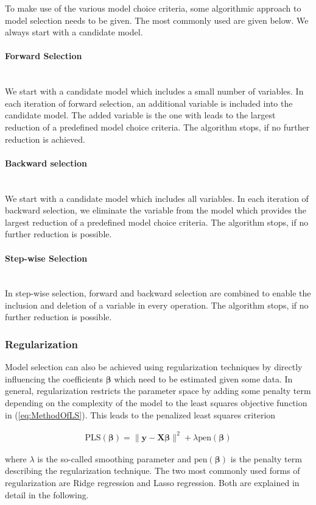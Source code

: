 \documentclass[10pt,a4paper]{article}
\newcommand{\subsubsubsection}[1]{\paragraph{#1}\mbox{}\\}
\begin{document}
To make use of the various model choice criteria, some algorithmic approach to model selection needs to be given. The most commonly used are given below. We always start with a candidate model. \cite{fahrmeir2013regression}

\subsubsubsection{Forward Selection}

We start with a candidate model which includes a small number of variables. In each iteration of forward selection, an additional variable is included into the candidate model.  The added variable is the one with leads to the largest reduction of a predefined model choice criteria. The algorithm stops, if no further reduction is achieved.

\subsubsubsection{Backward selection}

We start with a candidate model which includes all variables. In each iteration of backward selection, we eliminate the variable from the model which provides the largest reduction of a predefined model choice criteria. The algorithm stops, if no further reduction is possible. 

\subsubsubsection{Step-wise Selection}

In step-wise selection, forward and backward selection are combined to enable the inclusion and deletion of a variable in every operation. The algorithm stops, if no further reduction is possible.

\subsubsection{Regularization} \label{subsubsec:Regularization}

Model selection can also be achieved using regularization techniques by directly influencing the coefficients $\boldsymbol{\beta}$ which need to be estimated given some data. In general, regularization restricts the parameter space by adding some penalty term depending on the complexity of the model to the least squares objective function in (\ref{eq:MethodOfLS}). This leads to the penalized least squares criterion

\begin{align} \label{eq:PLS_crit}
	\text{PLS}(\boldsymbol{\beta}) = \lVert \boldsymbol{y} - \boldsymbol{X} \boldsymbol{\beta}\rVert^2 + \lambda \text{pen}(\boldsymbol{\beta})
\end{align}

where $\lambda$ is the so-called smoothing parameter and $\text{pen}(\boldsymbol{\beta})$ is the penalty term describing the regularization technique. The two most commonly used forms of regularization are Ridge regression and Lasso regression. Both are explained in detail in the following.
\end{document}
